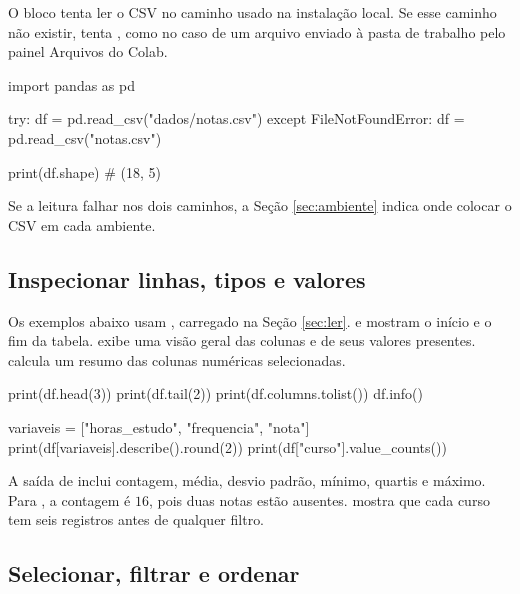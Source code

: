 O bloco tenta ler o CSV no caminho usado na instalação local. Se esse caminho não existir, tenta , como no caso de um arquivo enviado à pasta de trabalho pelo painel Arquivos do Colab.

\begin{exemplo}
import pandas as pd

try:
    df = pd.read_csv("dados/notas.csv")
except FileNotFoundError:
    df = pd.read_csv("notas.csv")

print(df.shape)  # (18, 5)
\end{exemplo}

Se a leitura falhar nos dois caminhos, a Seção \ref{sec:ambiente} indica onde colocar o CSV em cada ambiente.


\subsection{Inspecionar linhas, tipos e valores}

Os exemplos abaixo usam , carregado na Seção \ref{sec:ler}.  e  mostram o início e o fim da tabela.  exibe uma visão geral das colunas e de seus valores presentes.  calcula um resumo das colunas numéricas selecionadas.

\begin{exemplo}
print(df.head(3))
print(df.tail(2))
print(df.columns.tolist())
df.info()

variaveis = ["horas_estudo", "frequencia", "nota"]
print(df[variaveis].describe().round(2))
print(df["curso"].value_counts())
\end{exemplo}

A saída de  inclui contagem, média, desvio padrão, mínimo, quartis e máximo. Para , a contagem é \(16\), pois duas notas estão ausentes.  mostra que cada curso tem seis registros antes de qualquer filtro.

\subsection{Selecionar, filtrar e ordenar}
\label{sec:filtros}

